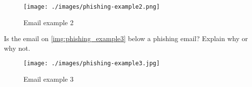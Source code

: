 \begin{figure}[h!p]
    \centering
    \texttt{[image: ./images/phishing-example2.png]}
    \caption{Email example 2}
    \label{img:phishing_example2}
\end{figure}

\newpage
\begin{question}[Question]
    Is the email on \autoref{img:phishing_example3} below a phishing email? Explain why or why not.
\end{question}
\begin{question}[Answer]
    \vspace{3cm}
\end{question}

\begin{figure}[h!p]
    \centering
    \texttt{[image: ./images/phishing-example3.jpg]}
    \caption{Email example 3}
    \label{img:phishing_example3}
\end{figure}